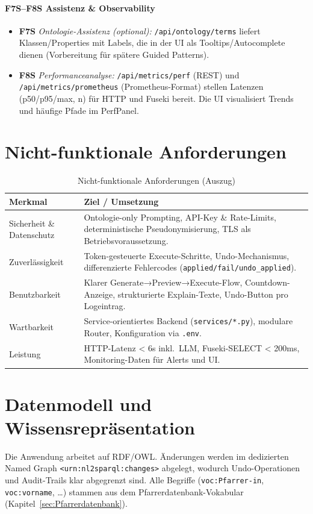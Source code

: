\paragraph{F7S–F8S Assistenz \& Observability}
\begin{itemize}
  \item \textbf{F7S} \emph{Ontologie-Assistenz (optional):} \texttt{/api/ontology/terms} liefert Klassen/Properties mit Labels, die in der UI als Tooltips/Autocomplete dienen (Vorbereitung für spätere Guided Patterns).
  \item \textbf{F8S} \emph{Performanceanalyse:} \texttt{/api/metrics/perf} (REST) und \texttt{/api/metrics/prometheus} (Prometheus-Format) stellen Latenzen (p50/p95/max, n) für HTTP und Fuseki bereit. Die UI visualisiert Trends und häufige Pfade im PerfPanel.
\end{itemize}

\section{Nicht-funktionale Anforderungen}
\begin{table}[ht]
  \centering
  \caption[Nicht-funktionale Anforderungen]{Nicht-funktionale Anforderungen (Auszug)}
  \label{tab:nicht-funktionale-anforderungen}
  \begin{tabular}{p{}p{}}
    \toprule
    \textbf{Merkmal} & \textbf{Ziel / Umsetzung} \\
    \midrule
    Sicherheit \& Datenschutz & Ontologie-only Prompting, API-Key \& Rate-Limits, deterministische Pseudonymisierung, TLS als Betriebsvoraussetzung. \\
    Zuverlässigkeit & Token-gesteuerte Execute-Schritte, Undo-Mechanismus, differenzierte Fehlercodes (\texttt{applied/fail/undo\_applied}). \\
    Benutzbarkeit & Klarer Generate→Preview→Execute-Flow, Countdown-Anzeige, strukturierte Explain-Texte, Undo-Button pro Logeintrag. \\
    Wartbarkeit & Service-orientiertes Backend (\texttt{services/*.py}), modulare Router, Konfiguration via \texttt{.env}. \\
    Leistung & HTTP-Latenz \textless{} 6s inkl.\ LLM, Fuseki-SELECT \textless{} 200ms, Monitoring-Daten für Alerts und UI. \\
    \bottomrule
  \end{tabular}
\end{table}

\section{Datenmodell und Wissensrepräsentation}
Die Anwendung arbeitet auf RDF/OWL. Änderungen werden im dedizierten Named Graph \texttt{<urn:nl2sparql:changes>} abgelegt, wodurch Undo-Operationen und Audit-Trails klar abgegrenzt sind. Alle Begriffe (\texttt{voc:Pfarrer-in}, \texttt{voc:vorname}, \ldots) stammen aus dem Pfarrerdatenbank-Vokabular (Kapitel~\ref{sec:Pfarrerdatenbank}).

